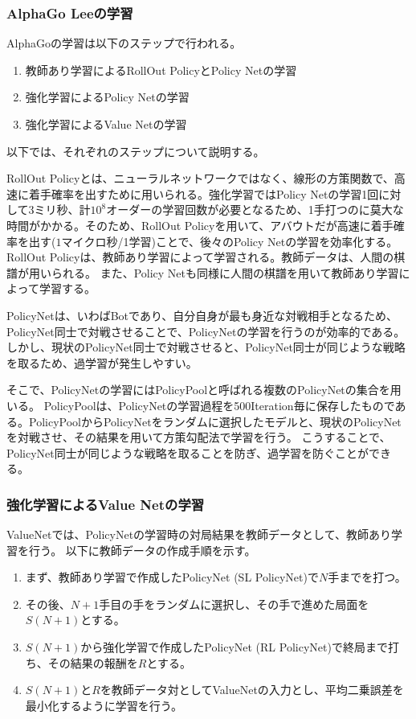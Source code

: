 \documentclass{ltjsarticle}
\begin{document}
\subsubsection{AlphaGo Leeの学習}
AlphaGoの学習は以下のステップで行われる。
\begin{enumerate}
  \item 教師あり学習によるRollOut PolicyとPolicy Netの学習
  \item 強化学習によるPolicy Netの学習
  \item 強化学習によるValue Netの学習
\end{enumerate}
以下では、それぞれのステップについて説明する。
\par
RollOut Policyとは、ニューラルネットワークではなく、線形の方策関数で、高速に着手確率を出すために用いられる。強化学習ではPolicy Netの学習1回に対して3ミリ秒、計$10^8$オーダーの学習回数が必要となるため、1手打つのに莫大な時間がかかる。そのため、RollOut Policyを用いて、アバウトだが高速に着手確率を出す($1マイクロ秒$/1学習)ことで、後々のPolicy Netの学習を効率化する。
RollOut Policyは、教師あり学習によって学習される。教師データは、人間の棋譜が用いられる。 
また、Policy Netも同様に人間の棋譜を用いて教師あり学習によって学習する。
\par
PolicyNetは、いわばBotであり、自分自身が最も身近な対戦相手となるため、PolicyNet同士で対戦させることで、PolicyNetの学習を行うのが効率的である。しかし、現状のPolicyNet同士で対戦させると、PolicyNet同士が同じような戦略を取るため、過学習が発生しやすい。
\par
そこで、PolicyNetの学習にはPolicyPoolと呼ばれる複数のPolicyNetの集合を用いる。
PolicyPoolは、PolicyNetの学習過程を500Iteration毎に保存したものである。PolicyPoolからPolicyNetをランダムに選択したモデルと、現状のPolicyNetを対戦させ、その結果を用いて方策勾配法で学習を行う。
こうすることで、PolicyNet同士が同じような戦略を取ることを防ぎ、過学習を防ぐことができる。

\subsubsection{強化学習によるValue Netの学習}
ValueNetでは、PolicyNetの学習時の対局結果を教師データとして、教師あり学習を行う。
以下に教師データの作成手順を示す。
\begin{enumerate}
  \item まず、教師あり学習で作成したPolicyNet (SL PolicyNet)で$N$手までを打つ。
  \item その後、$N+1$手目の手をランダムに選択し、その手で進めた局面を$S(N+1)$とする。
  \item $S(N+1)$から強化学習で作成したPolicyNet (RL PolicyNet)で終局まで打ち、その結果の報酬を$R$とする。
  \item $S(N+1)$と$R$を教師データ対としてValueNetの入力とし、平均二乗誤差を最小化するように学習を行う。
\end{enumerate}
\end{document}
